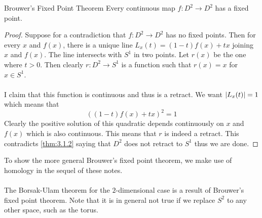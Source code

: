 \documentclass[a4paper]{article}
\begin{document}
\begin{crl}{Brouwer's Fixed Point Theorem}{} Every continuous map $f:D^2\to D^2$ has a fixed point. \tcbline
\begin{proof}
Suppose for a contradiction that $f:D^2\to D^2$ has no fixed points. Then for every $x$ and $f(x)$, there is a unique line $L_x(t)=(1-t)f(x)+tx$ joining $x$ and $f(x)$. The line intersects with $S^1$ in two points. Let $r(x)$ be the one where $t>0$. Then clearly $r:D^2\to S^1$ is a function such that $r(x)=x$ for $x\in S^1$. \\~\\
I claim that this function is continuous and thus is a retract. We want $\abs{L_x(t)}=1$ which means that $$((1-t)f(x)+tx)^2=1$$ Clearly the positive solution of this quadratic depends continuously on $x$ and $f(x)$ which is also continuous. This means that $r$ is indeed a retract. This contradicts \ref{thm:3.1.2} saying that $D^2$ does not retract to $S^1$ thus we are done. 
\end{proof}
\end{crl}

To show the more general Brouwer's fixed point theorem, we make use of homology in the sequel of these notes. \\~\\

The Borsak-Ulam theorem for the $2$-dimensional case is a result of Brouwer's fixed point theorem. Note that it is in general not true if we replace $S^2$ to any other space, such as the torus. 
\end{document}
